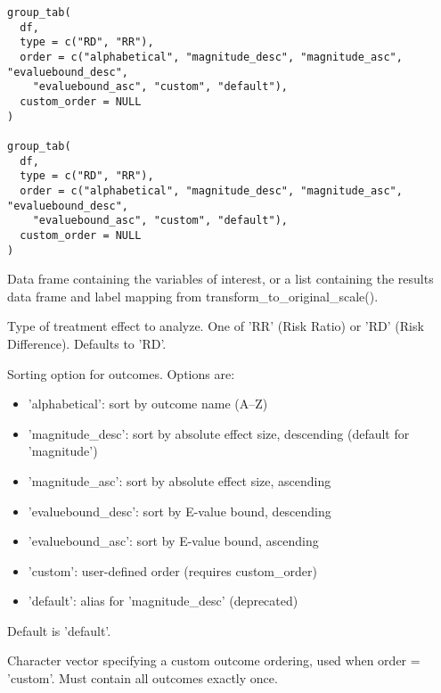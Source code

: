 \documentclass[a4paper]{book}
\begin{document}
%
\begin{Usage}
\begin{verbatim}
group_tab(
  df,
  type = c("RD", "RR"),
  order = c("alphabetical", "magnitude_desc", "magnitude_asc", "evaluebound_desc",
    "evaluebound_asc", "custom", "default"),
  custom_order = NULL
)

group_tab(
  df,
  type = c("RD", "RR"),
  order = c("alphabetical", "magnitude_desc", "magnitude_asc", "evaluebound_desc",
    "evaluebound_asc", "custom", "default"),
  custom_order = NULL
)
\end{verbatim}
\end{Usage}
%
\begin{Arguments}
\begin{ldescription}
\item[\code{df}] Data frame containing the variables of interest, or a list containing
the results data frame and label mapping from transform\_to\_original\_scale().

\item[\code{type}] Type of treatment effect to analyze. One of 'RR' (Risk Ratio) or
'RD' (Risk Difference). Defaults to 'RD'.

\item[\code{order}] Sorting option for outcomes. Options are:
\begin{itemize}

\item{} 'alphabetical': sort by outcome name (A–Z)
\item{} 'magnitude\_desc': sort by absolute effect size, descending (default for 'magnitude')
\item{} 'magnitude\_asc': sort by absolute effect size, ascending
\item{} 'evaluebound\_desc': sort by E-value bound, descending
\item{} 'evaluebound\_asc': sort by E-value bound, ascending
\item{} 'custom': user-defined order (requires custom\_order)
\item{} 'default': alias for 'magnitude\_desc' (deprecated)

\end{itemize}

Default is 'default'.

\item[\code{custom\_order}] Character vector specifying a custom outcome ordering,
used when order = 'custom'. Must contain all outcomes exactly once.
\end{ldescription}
\end{Arguments}
\end{document}
